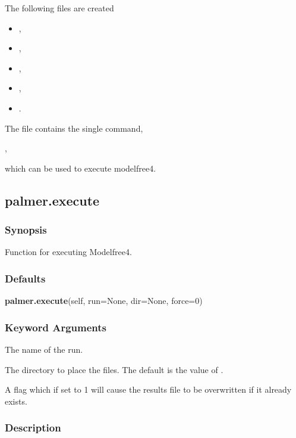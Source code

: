 The following files are created

\begin{itemize}
\item[]     
,
\item[]     
,
\item[]     
,
\item[]     
,
\item[]     
.
\end{itemize}

The file 
 contains the single command,

,

which can be used to execute modelfree4.


\newpage

\subsection{palmer.execute}


\subsubsection{Synopsis}

Function for executing Modelfree4.

\subsubsection{Defaults}

\textsf{\textbf{palmer.execute}(self, run=None, dir=None, force=0)}


\subsubsection{Keyword Arguments}


  The name of the run.

  The directory to place the files.  The default is the value of 
.

  A flag which if set to 1 will cause the results file to be overwritten if it already exists.

\subsubsection{Description}

